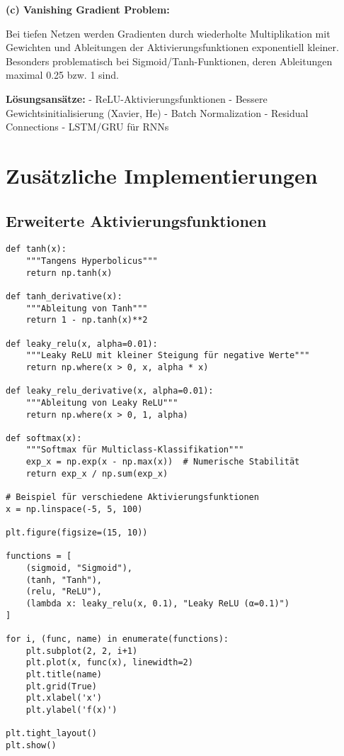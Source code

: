 \documentclass[12pt,a4paper]{article}
\begin{document}
\textbf{(c) Vanishing Gradient Problem:}

Bei tiefen Netzen werden Gradienten durch wiederholte Multiplikation mit Gewichten und Ableitungen der Aktivierungsfunktionen exponentiell kleiner. Besonders problematisch bei Sigmoid/Tanh-Funktionen, deren Ableitungen maximal 0.25 bzw. 1 sind.

\textbf{Lösungsansätze:}
- ReLU-Aktivierungsfunktionen
- Bessere Gewichtsinitialisierung (Xavier, He)
- Batch Normalization
- Residual Connections
- LSTM/GRU für RNNs

\section{Zusätzliche Implementierungen}

\subsection{Erweiterte Aktivierungsfunktionen}

\begin{lstlisting}[caption=Weitere Aktivierungsfunktionen]
def tanh(x):
    """Tangens Hyperbolicus"""
    return np.tanh(x)

def tanh_derivative(x):
    """Ableitung von Tanh"""
    return 1 - np.tanh(x)**2

def leaky_relu(x, alpha=0.01):
    """Leaky ReLU mit kleiner Steigung für negative Werte"""
    return np.where(x > 0, x, alpha * x)

def leaky_relu_derivative(x, alpha=0.01):
    """Ableitung von Leaky ReLU"""
    return np.where(x > 0, 1, alpha)

def softmax(x):
    """Softmax für Multiclass-Klassifikation"""
    exp_x = np.exp(x - np.max(x))  # Numerische Stabilität
    return exp_x / np.sum(exp_x)

# Beispiel für verschiedene Aktivierungsfunktionen
x = np.linspace(-5, 5, 100)

plt.figure(figsize=(15, 10))

functions = [
    (sigmoid, "Sigmoid"),
    (tanh, "Tanh"),
    (relu, "ReLU"),
    (lambda x: leaky_relu(x, 0.1), "Leaky ReLU (α=0.1)")
]

for i, (func, name) in enumerate(functions):
    plt.subplot(2, 2, i+1)
    plt.plot(x, func(x), linewidth=2)
    plt.title(name)
    plt.grid(True)
    plt.xlabel('x')
    plt.ylabel('f(x)')

plt.tight_layout()
plt.show()
\end{lstlisting}
\end{document}
